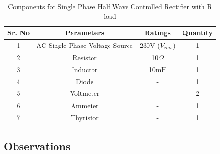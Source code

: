 \begin{table}[h]
    \renewcommand{\arraystretch}{1.3}
    \label{table_components_required_single-phase-half-wave-controlled-rectifier-with-R-load}
    \centering
    \begin{tabular}{|c|c|c|c|}
        \hline
        Sr. No & Parameters                     & Ratings            & Quantity \\
        \hline
        \hline
        1      & AC Single Phase Voltage Source & 230V ($ V_{rms} $) & 1        \\
        \hline
        2      & Resistor                       & 10$ \Omega $       & 1        \\
        \hline
        3      & Inductor                       & 10mH               & 1        \\
        \hline
        4      & Diode                          & -                  & 1        \\
        \hline
        5      & Voltmeter                      & -                  & 2        \\
        \hline
        6      & Ammeter                        & -                  & 1        \\
        \hline
        7      & Thyristor                      & -                  & 1        \\
        \hline
    \end{tabular}
    \caption{Components for Single Phase Half Wave Controlled Rectifier with R load}

\end{table}



\subsection{Observations}

